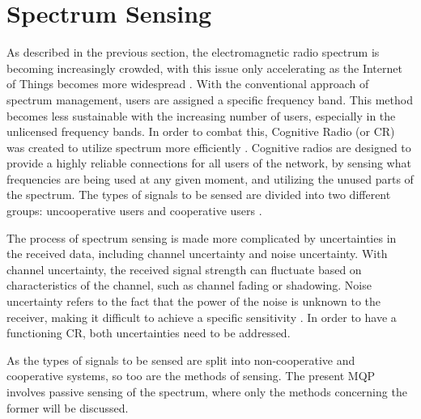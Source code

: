 \section{Spectrum Sensing}
As described in the previous section, the electromagnetic radio spectrum is becoming increasingly crowded, with this issue only accelerating as the Internet of Things becomes more widespread \cite{sensing_iot}. With the conventional approach of spectrum management, users are assigned a specific frequency band. This method becomes less sustainable with the increasing number of users, especially in the unlicensed frequency bands. In order to combat this, Cognitive Radio (or CR) was created to utilize spectrum more efficiently \cite{wyglinski_book}. Cognitive radios are designed to provide a highly reliable connections for all users of the network, by sensing what frequencies are being used at any given moment, and utilizing the unused parts of the spectrum. The types of signals to be sensed are divided into two different groups: uncooperative users and cooperative users \cite{spectrum_sense_methods}. \par
The process of spectrum sensing is made more complicated by uncertainties in the received data, including channel uncertainty and noise uncertainty. With channel uncertainty, the received signal strength can fluctuate based on characteristics of the channel, such as channel fading or shadowing. Noise uncertainty refers to the fact that the power of the noise is unknown to the receiver, making it difficult to achieve a specific sensitivity \cite{spectrum_sense_methods}. In order to have a functioning CR, both uncertainties need to be addressed. \par
As the types of signals to be sensed are split into non-cooperative and cooperative systems, so too are the methods of sensing. The present MQP involves passive sensing of the spectrum, where only the methods concerning the former will be discussed.

